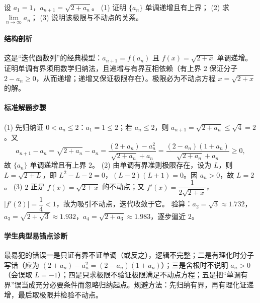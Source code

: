 \begin{problem}
设 $a_1=1$，$a_{n+1}=\sqrt{2+a_n}$。
(1) 证明 $\{a_n\}$ 单调递增且有上界；
(2) 求 $\lim\limits_{n\to\infty}a_n$；
(3) 说明该极限与不动点的关系。
\end{problem}
\begin{solution}
\paragraph{结构剖析}
这是“迭代函数列”的经典模型：$a_{n+1}=f(a_n)$ 且 $f(x)=\sqrt{2+x}$ 单调递增。证明单调有界须用数学归纳法，且递增与有界互相依赖（有上界 $2$ 保证分子 $2-a_n\ge0$，从而递增；递增又保证极限存在）。极限必为不动点方程 $x=\sqrt{2+x}$ 的解。
\paragraph{标准解题步骤}
(1) 先归纳证 $0<a_n\le2$：$a_1=1\le2$；若 $a_n\le2$，则 $a_{n+1}=\sqrt{2+a_n}\le\sqrt4=2$。又
$$a_{n+1}-a_n=\sqrt{2+a_n}-a_n
=\frac{(2+a_n)-a_n^2}{\sqrt{2+a_n}+a_n}
=\frac{(2-a_n)(1+a_n)}{\sqrt{2+a_n}+a_n}\ge0,$$
故 $\{a_n\}$ 单调递增且有上界 $2$。
(2) 由单调有界准则极限存在，设为 $L$，则 $L=\sqrt{2+L}$，即 $L^2-L-2=0$，$(L-2)(L+1)=0$。因 $a_n>0$，故 $L=2$。
(3) $2$ 正是 $f(x)=\sqrt{2+x}$ 的不动点；又 $f'(x)=\dfrac{1}{2\sqrt{2+x}}$，$|f'(2)|=\dfrac14<1$，故为吸引不动点，迭代收敛于它。
验算：$a_2=\sqrt3\approx1.732$，$a_3=\sqrt{2+\sqrt3}\approx1.932$，$a_4=\sqrt{2+a_3}\approx1.983$，逐步逼近 $2$。
\paragraph{学生典型易错点诊断}
最易犯的错误一是只证有界不证单调（或反之），逻辑不完整；二是有理化时分子写错（应为 $(2+a_n)-a_n^2=(2-a_n)(1+a_n)$）；三是舍根时不说明 $a_n>0$（会误取 $L=-1$）；四是只求极限不验证极限满足不动点方程；五是把“单调有界”误当成充分必要条件而忽略归纳起点。规避方法：先归纳有界，再有理化证递增，最后取极限并检验不动点。
\end{solution}

